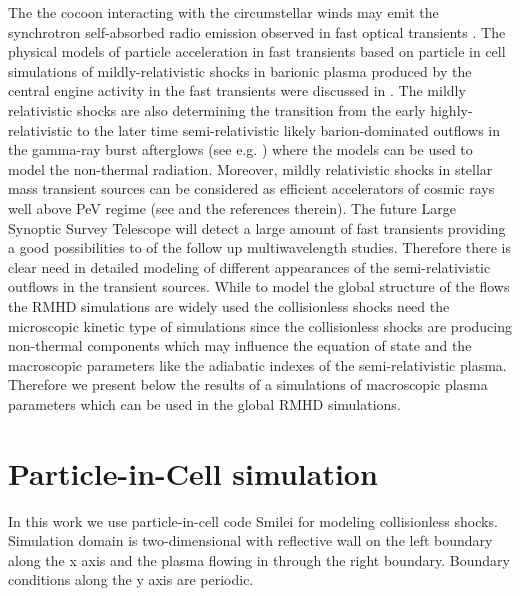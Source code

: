 \documentclass[a4paper]{jpconf}
\begin{document}
The the cocoon interacting with the circumstellar winds may emit the synchrotron self-absorbed radio emission observed in fast optical transients \citep{2022MNRAS.tmp..970G}. The physical models of particle acceleration in fast transients based on particle in cell simulations of mildly-relativistic shocks in barionic plasma produced by the central engine activity in the fast transients were discussed in \cite{BRO22_Univ}. The mildly relativistic shocks are also determining the transition from the early highly-relativistic to the later time semi-relativistic likely barion-dominated outflows in the gamma-ray burst afterglows (see e.g. \citep{Piran04,Meszaros06,GRBafterglow_hydro12}) where the models can be used to model the non-thermal radiation. Moreover, mildly relativistic shocks in stellar mass transient sources can be considered as efficient accelerators of cosmic rays well above PeV regime (see \citep{2018SSRv..214...41B} and the references therein). The future  Large Synoptic Survey Telescope will detect a large amount of fast transients providing a good possibilities to of the follow up multiwavelength studies. Therefore there is clear need in detailed modeling of different appearances of the semi-relativistic outflows in the transient sources. While to model the global structure of the flows the RMHD simulations are widely used the collisionless shocks need the microscopic kinetic type of simulations since the collisionless shocks are producing non-thermal components which may influence the equation of state and the macroscopic parameters like the adiabatic indexes of the semi-relativistic plasma. Therefore we present below the results of a simulations of macroscopic plasma parameters which can be used in the global RMHD simulations.      
 

\section{Particle-in-Cell simulation}
In this work we use particle-in-cell code Smilei \cite{Smilei18} for modeling collisionless shocks. Simulation domain is two-dimensional with reflective wall on the left boundary along the x axis and the plasma flowing in through the right boundary. Boundary conditions along the y axis are periodic.
\end{document}
